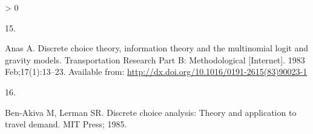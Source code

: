 \documentclass{article}
\newlength{\csllabelwidth}
\newlength{\cslhangindent}
\newenvironment{CSLReferences}[2] %
 {%
  \setlength{\parindent}{0pt}
  \ifodd #1 \everypar{\setlength{\hangindent}{\cslhangindent}}\ignorespaces\fi
  \ifnum #2 > 0
  \setlength{\parskip}{#2\baselineskip}
  \fi
 }%
 {}
\newcommand{\CSLLeftMargin}[1]{\parbox[t]{\csllabelwidth}{#1}}
\newcommand{\CSLRightInline}[1]{\parbox[t]{\linewidth - \csllabelwidth}{#1}\break}
\begin{document}
\begin{CSLReferences}{0}{0}
\leavevmode\hypertarget{ref-anas1983}{}%
\CSLLeftMargin{15. }
\CSLRightInline{Anas A. Discrete choice theory, information theory and
the multinomial logit and gravity models. Transportation Research Part
B: Methodological {[}Internet{]}. 1983 Feb;17(1):13--23. Available from:
\url{http://dx.doi.org/10.1016/0191-2615(83)90023-1}}

\leavevmode\hypertarget{ref-ben1985}{}%
\CSLLeftMargin{16. }
\CSLRightInline{Ben-Akiva M, Lerman SR. Discrete choice analysis: Theory
and application to travel demand. MIT Press; 1985. }

\end{CSLReferences}



\end{document}
